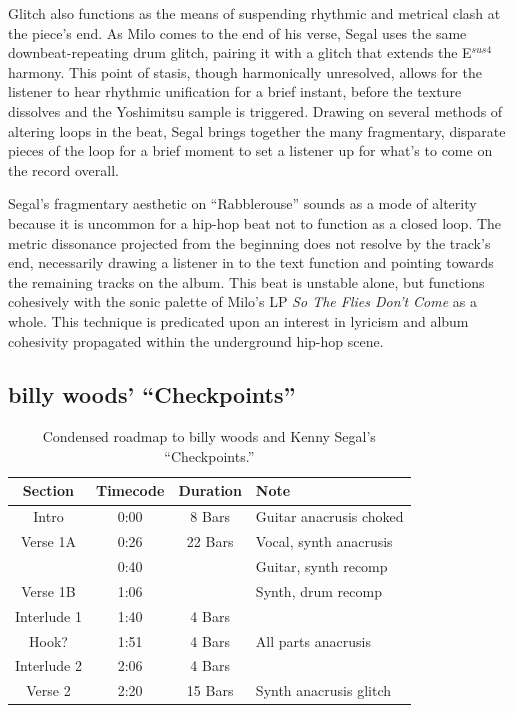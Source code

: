 Glitch also functions as the means of suspending rhythmic and metrical clash at the piece's end. As Milo comes to the end of his verse, Segal uses the same downbeat-repeating drum glitch, pairing it with a glitch that extends the E$^{sus4}$ harmony. This point of stasis, though harmonically unresolved, allows for the listener to hear rhythmic unification for a brief instant, before the texture dissolves and the Yoshimitsu sample is triggered. Drawing on several methods of altering loops in the beat, Segal brings together the many fragmentary, disparate pieces of the loop for a brief moment to set a listener up for what's to come on the record overall.

Segal's fragmentary aesthetic on ``Rabblerouse'' sounds as a mode of alterity because it is uncommon for a hip-hop beat not to function as a closed loop. The metric dissonance projected from the beginning does not resolve by the track's end, necessarily drawing a listener in to the text function and pointing towards the remaining tracks on the album. This beat is unstable alone, but functions cohesively with the sonic palette of Milo's LP \textit{So The Flies Don't Come} as a whole. This technique is predicated upon an interest in lyricism and album cohesivity propagated within the underground hip-hop scene.

\subsection*{\centering billy woods' ``Checkpoints''}

\begin{table}[ht]
    \centering
    \begin{tabular}{|c|c|c|l|}
        \hline
         Section      & Timecode & Duration & Note                          \\ \hline
         Intro        & 0:00     & 8 Bars   & Guitar anacrusis choked       \\ \hline
         Verse 1A     & 0:26     & 22 Bars  & Vocal, synth  anacrusis       \\ \hline
                      & 0:40     &          & Guitar, synth recomp          \\ \hline
         Verse 1B     & 1:06     &          & Synth, drum recomp            \\ \hline
         Interlude 1  & 1:40     & 4 Bars   &                               \\ \hline
         Hook?        & 1:51     & 4 Bars   & All parts anacrusis           \\ \hline
         Interlude 2  & 2:06     & 4 Bars   &                               \\ \hline
         Verse 2      & 2:20     & 15 Bars  & Synth anacrusis glitch        \\ \hline
         
    \end{tabular}
    \caption{Condensed roadmap to billy woods and Kenny Segal's ``Checkpoints.''}
    \label{tab:checkpoints}
\end{table}

